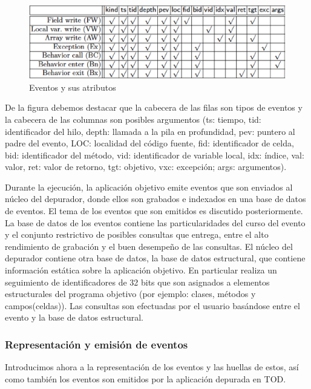 \documentclass[12pt,legalpaper]{report}
\begin{document}
\begin{figure}[hpb]
	\centering
	\includegraphics[scale=0.5]{images/TOD/EventsAttributes.eps}
	\caption{Eventos y sus atributos}
	\label{EventsAttributes}
\end{figure}

De la figura debemos destacar que la cabecera de las filas son tipos de eventos y la cabecera de las columnas son posibles argumentos (ts: tiempo, tid: identificador del hilo, depth: llamada a la pila en profundidad, pev: puntero al padre del evento, LOC: localidad del código fuente, fid: identificador de celda, bid: identificador del método, vid: identificador de variable local, idx: índice, val: valor, ret: valor de retorno, tgt: objetivo, vxc: excepción; args: argumentos).

Durante la ejecución, la aplicación objetivo emite eventos que son enviados al núcleo del depurador, donde ellos son grabados e indexados en una base de datos de eventos.  El tema de los eventos que son emitidos es discutido posteriormente.  La base de datos de los eventos contiene las particularidades del curso del evento y el conjunto restrictivo de posibles consultas que entrega, entre el alto rendimiento de grabación y el buen desempeño de las consultas.  El núcleo del depurador contiene otra base de datos, la base de datos estructural, que contiene información estática sobre la aplicación objetivo.  En particular realiza un seguimiento de identificadores de 32 bits que son asignados a elementos estructurales del programa objetivo (por ejemplo: clases, métodos y campos(celdas)).  Las consultas son efectuadas por el usuario basándose entre el evento y la base de datos estructural.

			\subsubsection{Representación y emisión de eventos}

Introducimos ahora a la representación de los eventos y las huellas de estos, así como también los eventos son emitidos por la aplicación depurada en TOD.
\end{document}
